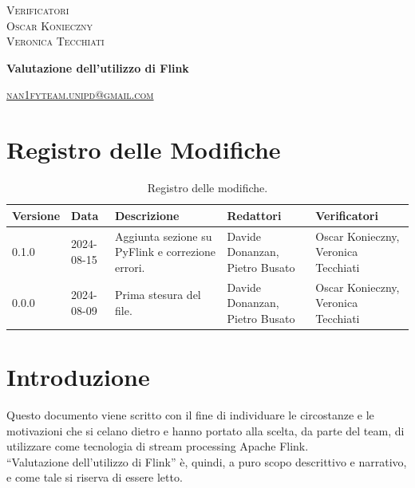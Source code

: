 \documentclass[8pt]{article}
\begin{document}
\begin{titlepage}
\begin{minipage}[t]{0.47\textwidth}
{		}
		\vspace{8mm}
		
		{\large{\textsc{Verificatori}}
			\vspace{3mm}
			{\\\large{\textsc{Oscar Konieczny}\\}}  %
			{\large{\textsc{Veronica Tecchiati}}}
			
		}
		\vspace{4mm}\vspace{4mm}
	\end{minipage}
	\vspace{4cm}
	\begin{center}
		\begin{flushright}
			{\fontsize{30pt}{52pt}\selectfont \textbf{Valutazione dell'utilizzo di Flink\\}} %
		\end{flushright}
		\vspace{3cm}
	\end{center}
	\vspace{9.5cm}
	{\small \textsc{\href{mailto: nan1fyteam.unipd@gmail.com}{nan1fyteam.unipd@gmail.com}}}
\end{titlepage}
\pagestyle{mystyle}
\section*{Registro delle Modifiche}
\begin{table}[ht!]
\hypersetup{hidelinks}
	\centering
	\begin{tabular}{p{1.2cm} p{2cm} p{4cm} p{4cm} p{3cm}}
		\toprule
		\textbf{Versione} & \textbf{Data} & \textbf{Descrizione} & \textbf{Redattori} & \textbf{Verificatori} \\
		\midrule
			0.1.0 & 2024-08-15 & Aggiunta sezione su PyFlink e correzione errori. & Davide Donanzan, Pietro Busato & Oscar Konieczny, Veronica Tecchiati \\
            0.0.0 & 2024-08-09 & Prima stesura del file. & Davide Donanzan, Pietro Busato & Oscar Konieczny, Veronica Tecchiati \\
		\bottomrule
	\end{tabular}
	\caption{Registro delle modifiche.}\label{table:Registro delle modifiche}
\end{table}
\newpage
\tableofcontents
\clearpage
\newpage
\justifying
\section{Introduzione}
Questo documento viene scritto con il fine di individuare le circostanze e le motivazioni che si celano dietro e hanno portato alla scelta, da parte del team, di utilizzare come tecnologia di stream processing Apache Flink.\\
``Valutazione dell'utilizzo di Flink'' è, quindi, a puro scopo descrittivo e narrativo, e come tale si riserva di essere letto.
\end{document}
